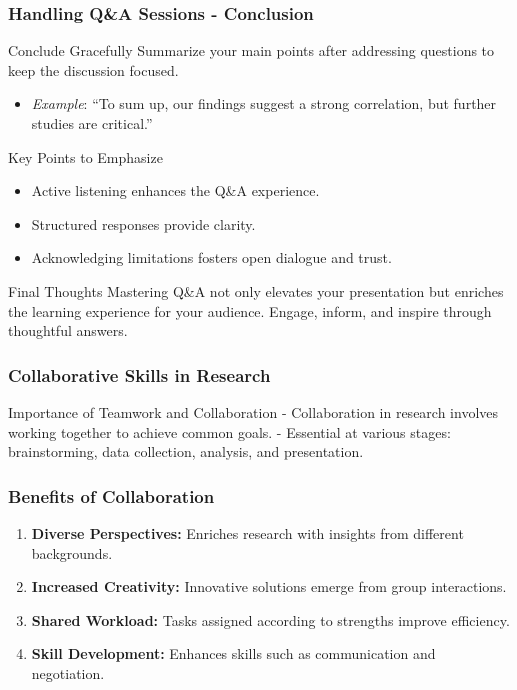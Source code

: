 \documentclass[aspectratio=169]{beamer}
\begin{document}
\begin{frame}[fragile]
    \frametitle{Handling Q\&A Sessions - Conclusion}
    \begin{block}{Conclude Gracefully}
        Summarize your main points after addressing questions to keep the discussion focused.
        \begin{itemize}
            \item \textit{Example}: “To sum up, our findings suggest a strong correlation, but further studies are critical.”
        \end{itemize}
    \end{block}
    
    \begin{block}{Key Points to Emphasize}
        \begin{itemize}
            \item Active listening enhances the Q\&A experience.
            \item Structured responses provide clarity.
            \item Acknowledging limitations fosters open dialogue and trust.
        \end{itemize}
    \end{block}
    
    \begin{block}{Final Thoughts}
        Mastering Q\&A not only elevates your presentation but enriches the learning experience for your audience. Engage, inform, and inspire through thoughtful answers.
    \end{block}
\end{frame}

\begin{frame}[fragile]
    \frametitle{Collaborative Skills in Research}
    \begin{block}{Importance of Teamwork and Collaboration}
        - Collaboration in research involves working together to achieve common goals.
        - Essential at various stages: brainstorming, data collection, analysis, and presentation.
    \end{block}
\end{frame}

\begin{frame}[fragile]
    \frametitle{Benefits of Collaboration}
    \begin{enumerate}
        \item \textbf{Diverse Perspectives:} Enriches research with insights from different backgrounds.
        \item \textbf{Increased Creativity:} Innovative solutions emerge from group interactions.
        \item \textbf{Shared Workload:} Tasks assigned according to strengths improve efficiency.
        \item \textbf{Skill Development:} Enhances skills such as communication and negotiation.
    \end{enumerate}
\end{frame}
\end{document}
